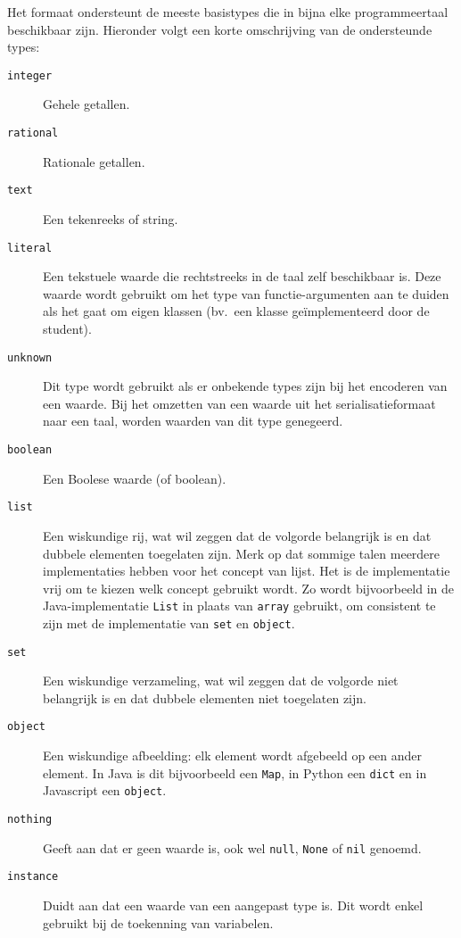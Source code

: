 Het formaat ondersteunt de meeste basistypes die in bijna elke programmeertaal beschikbaar zijn.
Hieronder volgt een korte omschrijving van de ondersteunde types:

\begin{description}
    \item[\texttt{integer}] Gehele getallen.
    \item[\texttt{rational}] Rationale getallen.
    \item[\texttt{text}] Een tekenreeks of string.
    \item[\texttt{literal}] Een tekstuele waarde die rechtstreeks in de taal zelf beschikbaar is.
    Deze waarde wordt gebruikt om het type van functie-argumenten aan te duiden als het gaat om eigen klassen (bv.\  een klasse geïmplementeerd door de student).
    \item[\texttt{unknown}] Dit type wordt gebruikt als er onbekende types zijn bij het encoderen van een waarde.
    Bij het omzetten van een waarde uit het serialisatieformaat naar een taal, worden waarden van dit type genegeerd.
    \item[\texttt{boolean}] Een Boolese waarde (of boolean).
    \item[\texttt{list}] Een wiskundige rij, wat wil zeggen dat de volgorde belangrijk is en dat dubbele elementen toegelaten zijn.
    Merk op dat sommige talen meerdere implementaties hebben voor het concept van lijst.
    Het is de implementatie vrij om te kiezen welk concept gebruikt wordt.
    Zo wordt bijvoorbeeld in de Java-implementatie \texttt{List} in plaats van \texttt{array} gebruikt, om consistent te zijn met de implementatie van \texttt{set} en \texttt{object}.
    \item[\texttt{set}] Een wiskundige verzameling, wat wil zeggen dat de volgorde niet belangrijk is en dat dubbele elementen niet toegelaten zijn.
    \item[\texttt{object}] Een wiskundige afbeelding: elk element wordt afgebeeld op een ander element.
    In Java is dit bijvoorbeeld een \texttt{Map}, in Python een \texttt{dict} en in Javascript een \texttt{object}.
    \item[\texttt{nothing}] Geeft aan dat er geen waarde is, ook wel \texttt{null}, \texttt{None} of \texttt{nil} genoemd.
    \item[\texttt{instance}] Duidt aan dat een waarde van een aangepast type is.
    Dit wordt enkel gebruikt bij de toekenning van variabelen.
\end{description}

